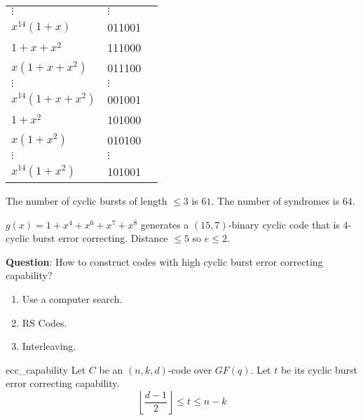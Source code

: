 \begin{table}[H]
\begin{tabularx}{\linewidth}{@{}YYY@{}}
        $ \vdots $          & $ \vdots $                                           \\
        $ x^{14}(1+x) $     & 011001                                               \\
        \midrule
        $ 1+x+x^2 $         & 111000                                               \\
        $ x(1+x+x^2) $      & 011100                                               \\
        $ \vdots $          & $ \vdots $                                           \\
        $ x^{14}(1+x+x^2) $ & 001001                                               \\
        \midrule
        $ 1+x^2 $           & 101000                                               \\
        $ x(1+x^2) $        & 010100                                               \\
        $ \vdots $          & $ \vdots $                                           \\
        $ x^{14}(1+x^2) $   & 101001                                               \\
    \end{tabularx}
\end{table}
The number of cyclic bursts of length $ \leqslant 3 $ is $ 61 $.
The number of syndromes is $ 64 $.

\begin{Example}{}{}
    $ g(x)=1+x^4+x^6+x^7+x^8 $ generates a $ (15,7) $-binary cyclic
    code that is $ 4 $-cyclic burst error correcting.
    Distance $ \leqslant 5 $ so $ e\leqslant 2 $.
\end{Example}

\textbf{Question}: How to construct codes with high cyclic burst error
correcting capability?
\begin{enumerate}[label=(\arabic*)]
    \item Use a computer search.
    \item RS Codes.
    \item Interleaving.
\end{enumerate}

\begin{Theorem}{}{ecc_capability}
    Let $ C $ be an $ (n,k,d) $-code over $ GF(q) $. Let $ t $ be its
    cyclic burst error correcting capability.
    \[ \left\lfloor \frac{d-1}{2} \right\rfloor \leqslant t \leqslant n-k \]
\end{Theorem}

